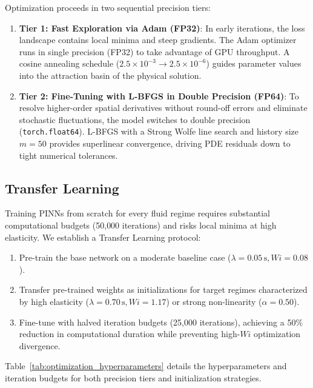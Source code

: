 Optimization proceeds in two sequential precision tiers:
\begin{enumerate}
    \item \textbf{Tier 1: Fast Exploration via Adam (FP32)}:
        In early iterations, the loss landscape contains local minima and steep
        gradients. The Adam optimizer runs in single precision (FP32) to take
        advantage of GPU throughput. A cosine annealing schedule
        ($2.5 \times 10^{-3} \to 2.5 \times 10^{-6}$) guides parameter values
        into the attraction basin of the physical solution.
    \item \textbf{Tier 2: Fine-Tuning with L-BFGS in Double Precision (FP64)}:
        To resolve higher-order spatial derivatives without round-off errors and
        eliminate stochastic fluctuations, the model switches to double precision
        (\texttt{torch.float64}). L-BFGS with a Strong Wolfe line search and history
        size $m=50$ provides superlinear convergence, driving PDE residuals down
        to tight numerical tolerances.
\end{enumerate}

\subsection{Transfer Learning}
\label{subsec:transfer_learning_protocol}

Training PINNs from scratch for every fluid regime requires substantial computational
budgets (50{,}000 iterations) and risks local minima at high elasticity.
We establish a Transfer Learning protocol:
\begin{enumerate}
    \item Pre-train the base network on a moderate baseline case
        ($\lambda = 0.05\,\mathrm{s}, Wi = 0.08$).
    \item Transfer pre-trained weights as initializations for target regimes
        characterized by high elasticity ($\lambda = 0.70\,\mathrm{s}, Wi = 1.17$) or
        strong non-linearity ($\alpha = 0.50$).
    \item Fine-tune with halved iteration budgets (25{,}000 iterations), achieving a
        50\% reduction in computational duration while preventing high-$Wi$
        optimization divergence.
\end{enumerate}

Table~\ref{tab:optimization_hyperparameters} details the hyperparameters and
iteration budgets for both precision tiers and initialization strategies.

